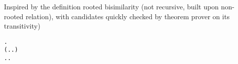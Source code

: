 \begin{frame}[fragile]
\begin{small}
Inspired by the definition rooted bisimilarity (not recursive, built
upon non-rooted relation), with candidates quickly checked by
theorem prover on its transitivity)
\begin{alltt}
\HOLTokenTurnstile{}  \HOLSymConst{\HOLTokenObsCongr}  \HOLSymConst{\HOLTokenEquiv{}}
   \HOLSymConst{\HOLTokenForall{}}.
       (\HOLSymConst{\HOLTokenForall{}}.  \HOLTokenTransBegin{}\HOLTokenTransEnd {} \HOLSymConst{\HOLTokenImp{}} \HOLSymConst{\HOLTokenExists{}}.  \HOLTokenWeakTransBegin{}\HOLTokenWeakTransEnd {} \HOLSymConst{\HOLTokenConj{}}  \HOLSymConst{\HOLTokenWeakEQ} ) \HOLSymConst{\HOLTokenConj{}}
       \HOLSymConst{\HOLTokenForall{}}.  \HOLTokenTransBegin{}\HOLTokenTransEnd {} \HOLSymConst{\HOLTokenImp{}} \HOLSymConst{\HOLTokenExists{}}.  \HOLTokenWeakTransBegin{}\HOLTokenWeakTransEnd {} \HOLSymConst{\HOLTokenConj{}}  \HOLSymConst{\HOLTokenWeakEQ} 
\end{alltt}
\end{small}
\end{frame}


